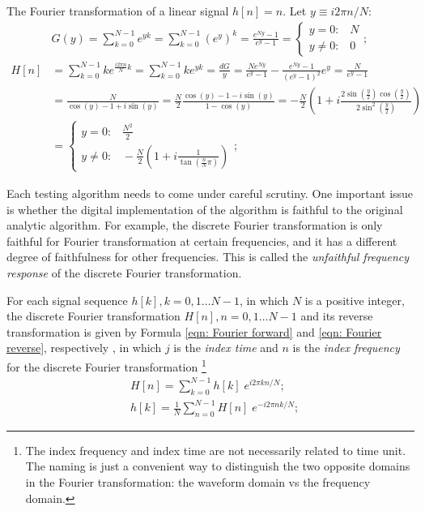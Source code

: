 \documentclass[twoside]{article}
\numberwithin{equation}{section}
\newcommand{\eqspace}{\;\;\;}
\begin{document}
The Fourier transformation of a linear signal $h[n] = n$. 
Let $y \equiv i 2\pi n /N$:
\begin{align*}
& G(y) = \sum_{k=0}^{N-1}  e^{y k} = \sum_{k=0}^{N-1}  (e^y)^k = \frac{e^{N y} - 1}{e^y - 1}
 = \begin{cases} y = 0: \eqspace N \\ y \neq 0: \eqspace 0 \end{cases}; \\
H[n] &= \sum_{k=0}^{N-1} k e^{\frac{i 2\pi n}{N} k} = \sum_{k=0}^{N-1} k e^{y k} 
 = \frac{d G}{y} = \frac{N e^{N y}}{e^y - 1} - \frac{e^{N y} - 1}{(e^y - 1)^2} e^y = \frac{N}{e^y - 1} \\
 &= \frac{N}{\cos(y) - 1 + i \sin(y)} = \frac{N}{2} \frac{\cos(y) - 1 -  i \sin(y)}{1 - \cos(y)} 
  = - \frac{N}{2}(1 + i \frac{2 \sin(\frac{y}{2}) \cos(\frac{y}{2})}{2 \sin^2(\frac{y}{2})}) \\
 &= \begin{cases} y = 0: \eqspace \frac{N^2}{2} \\ y \neq 0: \eqspace - \frac{N}{2}(1 + i \frac{1}{\tan(\frac{n}{N} \pi)}) \end{cases};
\end{align*}

\fi


Each testing algorithm needs to come under careful scrutiny.  
One important issue is whether the digital implementation of the algorithm is faithful to the original analytic algorithm.  
For example, the discrete Fourier transformation is only faithful for Fourier transformation at certain frequencies, and it has a different degree of faithfulness for other frequencies.  
This is called the \emph{unfaithful frequency response} of the discrete Fourier transformation.

For each signal sequence $h[k], k = 0, 1 \dots  N-1$, in which $N$ is a positive integer, the discrete Fourier transformation $H[n], n = 0, 1 \dots  N-1$ and its reverse transformation is given by Formula \eqref{eqn: Fourier forward} and \eqref{eqn: Fourier reverse}, respectively  \cite{Numerical_Recipes}, in which $j$ is the \emph{index time} and $n$ is the \emph{index frequency} for the discrete Fourier transformation
\footnote{The index frequency and index time are not necessarily related to time unit.  
The naming is just a convenient way to distinguish the two opposite domains in the Fourier transformation: the waveform domain vs the frequency domain.}
\begin{align}
\label{eqn: Fourier forward}
& H[n]=\sum_{k=0}^{N-1} h[k] \; e^{i 2\pi k n/N}; \\
\label{eqn: Fourier reverse}
& h[k]=\frac{1}{N} \sum_{n=0}^{N-1} H[n] \; e^{-i 2\pi n k/N};
\end{align}
\end{document}
